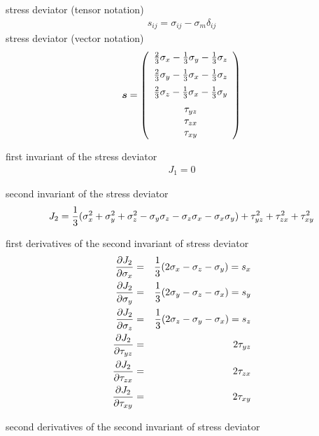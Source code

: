 stress deviator (tensor notation)
\begin{eqnarray}
s_{ij} = \sigma_{ij} - \sigma_m \delta_{ij}
\end{eqnarray}
stress deviator (vector notation)
\begin{eqnarray}
\mbox{\boldmath$s$} = \left(\begin{array}{c}
\frac{2}{3}\sigma_{x} - \frac{1}{3}\sigma_{y} - \frac{1}{3}\sigma_{z}
\\[2mm]
\frac{2}{3}\sigma_{y} - \frac{1}{3}\sigma_{x} - \frac{1}{3}\sigma_{z}
\\[2mm]
\frac{2}{3}\sigma_{z} - \frac{1}{3}\sigma_{x} - \frac{1}{3}\sigma_{y}
\\[2mm]
\tau_{yz}
\\
\tau_{zx}
\\
\tau_{xy}
\end{array}\right)
\end{eqnarray}

first invariant of the stress deviator
\begin{eqnarray}
J_1 = 0
\end{eqnarray}

second invariant of the stress deviator
\begin{eqnarray}
J_2 = \mbox{$\displaystyle\frac{1}{3}$}(\sigma_x^2 + \sigma_y^2 + \sigma_z^2 - \sigma_y \sigma_z - \sigma_z \sigma_x -
\sigma_x \sigma_y) + \tau_{yz}^2 + \tau_{zx}^2 + \tau_{xy}^2
\end{eqnarray}

first derivatives of the second invariant of stress deviator
\begin{eqnarray}
\mbox{$\displaystyle\frac{\partial{J_2}}{\partial{\sigma_x}}$} &=& \mbox{$\displaystyle\frac{1}{3}$} (2 \sigma_x - \sigma_z - \sigma_y) = s_x
\\
\mbox{$\displaystyle\frac{\partial{J_2}}{\partial{\sigma_y}}$} &=& \mbox{$\displaystyle\frac{1}{3}$} (2 \sigma_y - \sigma_z - \sigma_x) = s_y
\\
\mbox{$\displaystyle\frac{\partial{J_2}}{\partial{\sigma_z}}$} &=& \mbox{$\displaystyle\frac{1}{3}$} (2 \sigma_z - \sigma_y - \sigma_x) = s_z
\\
\mbox{$\displaystyle\frac{\partial{J_2}}{\partial{\tau_{yz}}}$} &=& 2 \tau_{yz}
\\
\mbox{$\displaystyle\frac{\partial{J_2}}{\partial{\tau_{zx}}}$} &=& 2 \tau_{zx}
\\
\mbox{$\displaystyle\frac{\partial{J_2}}{\partial{\tau_{xy}}}$} &=& 2 \tau_{xy}
\end{eqnarray}

second derivatives of the second invariant of stress deviator

